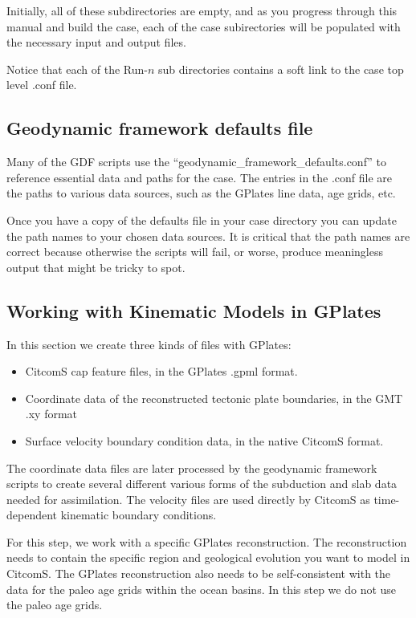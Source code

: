 \documentclass[letterpaper,12pt]{article}
\begin{document}
Initially, all of these subdirectories are empty, and as you progress through this manual and build the case, 
each of the case subirectories will be populated with the necessary input and output files.

Notice that each of the Run-$n$ sub directories contains a soft link to the case top level .conf file.

\subsection{Geodynamic framework defaults file}

Many of the GDF scripts use the ``geodynamic\_framework\_defaults.conf'' to reference essential data and paths for the case.
The entries in the .conf file are the paths to various data sources, such as the GPlates line data, age grids, etc.

Once you have a copy of the defaults file in your case directory you can update the path names to your chosen data sources.
It is critical that the path names are correct because otherwise the scripts will fail, or worse, 
produce meaningless output that might be tricky to spot.

\subsection{Working with Kinematic Models in GPlates}

In this section we create three kinds of files with GPlates:

\begin{itemize}
\item CitcomS cap feature files, in the GPlates .gpml format.
\item Coordinate data of the reconstructed tectonic plate boundaries, in the GMT .xy format
\item Surface velocity boundary condition data, in the native CitcomS format. 
\end{itemize}

The coordinate data files are later processed by the geodynamic framework scripts to create several different various forms of the subduction and slab data needed for assimilation.  The velocity files are used directly by CitcomS as time-dependent kinematic boundary conditions.

For this step, we work with a specific GPlates reconstruction.  The reconstruction needs to contain the specific region and geological evolution you want to model in CitcomS.  The GPlates reconstruction also needs to be self-consistent with the data for the paleo age grids within the ocean basins.  In this step we do not use the paleo age grids.
\end{document}
